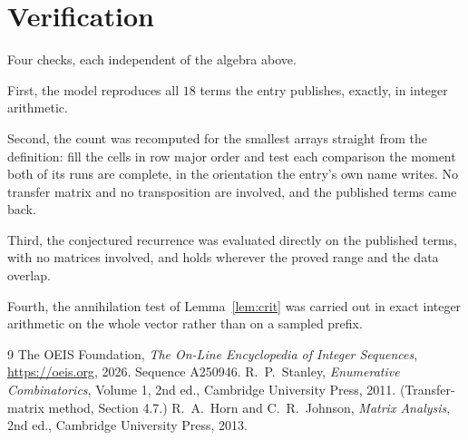 \documentclass[11pt,a4paper]{article}
\theoremstyle{plain}
\theoremstyle{definition}
\begin{document}
\section{Verification}

Four checks, each independent of the algebra above.

First, the model reproduces all $18$ terms the entry publishes, exactly, in integer
arithmetic.

Second, the count was recomputed for the smallest arrays straight from the definition: fill the
cells in row major order and test each comparison the moment both of its runs are complete,
in the orientation the entry's own name writes. No transfer matrix and no transposition are
involved, and the published terms came back.

Third, the conjectured recurrence was evaluated directly on the published terms, with no
matrices involved, and holds wherever the proved range and the data overlap.

Fourth, the annihilation test of Lemma~\ref{lem:crit} was carried out in exact integer
arithmetic on the whole vector rather than on a sampled prefix.

\begin{thebibliography}{9}
 The OEIS Foundation, \emph{The On-Line Encyclopedia of Integer
Sequences}, \url{https://oeis.org}, 2026. Sequence A250946.
 R.~P.~Stanley, \emph{Enumerative Combinatorics}, Volume 1, 2nd ed.,
Cambridge University Press, 2011. (Transfer-matrix method, Section 4.7.)
 R.~A.~Horn and C.~R.~Johnson, \emph{Matrix Analysis}, 2nd ed., Cambridge
University Press, 2013.
\end{thebibliography}
\end{document}
